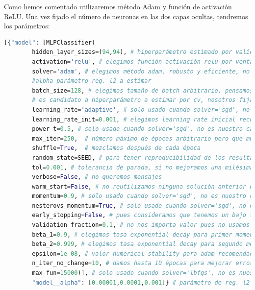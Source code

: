 \documentclass[11pt,a4paper]{article}
\theoremstyle{definition}
\begin{document}
	Como hemos comentado utilizaremos método Adam y función de activación ReLU.
	Una vez fijado el número de neuronas en las dos capas ocultas, tendremos los parámetros:
	\begin{lstlisting}[language=Python, caption= Par\'ametros usados en MLPClassifier, inputencoding=latin1]
  [{"model": [MLPClassifier(
        hidden_layer_sizes=(94,94), # hiperparámetro estimado por validación cruzada
        activation='relu', # elegimos función activación relu por ventajas ante tanh y sigmoide
        solver='adam', # elegimos método adam, robusto y eficiente, no requiere afinar tanto parámetros como sgd
        #alpha parámetro reg. l2 a estimar
        batch_size=128, # elegimos tamaño de batch arbitrario, pensamos que es un tamaño razonable para el tamaño de nuestro dataset aunque no podemos saber cómo se comportará si no es experimentalmente
        # es candidato a hiperparámetro a estimar por cv, nosotros fijamos uno por no hacer cv con mucha carga
        learning_rate='adaptive', # solo usado cuando solver='sgd', no es nuestro caso
        learning_rate_init=0.001, # elegimos learning rate inicial recomendado (pág. 2 https://arxiv.org/pdf/1412.6980.pdf) (buenos resultados por defecto)
        power_t=0.5, # solo usado cuando solver='sgd', no es nuestro caso
        max_iter=250,  # número máximo de épocas arbitrario pero que muestra convergencia
        shuffle=True,  # mezclamos después de cada época
        random_state=SEED, # para tener reproducibilidad de los resultados
        tol=0.001, # tolerancia de parada, si no mejoramos una milésima tras n_iter_no_change épocas entonces paramos, pensamos que es un valor razonable
        verbose=False, # no queremos mensajes
        warm_start=False, # no reutilizamos ninguna solución anterior durante la validación cruzada
        momentum=0.9, # solo usado cuando solver='sgd', no es nuestro caso
        nesterovs_momentum=True, # solo usado cuando solver='sgd', no es nuestro caso
        early_stopping=False, # pues consideramos que tenemos un bajo tamaño de entrenamiento
        validation_fraction=0.1, # no nos importa valor pues no usamos early_stopping
        beta_1=0.9, # elegimos tasa exponential decay para primer momento recomendada (pág. 2 https://arxiv.org/pdf/1412.6980.pdf) (buenos resultados por defecto)
        beta_2=0.999, # elegimos tasa exponential decay para segundo momento recomendada (pág. 2 https://arxiv.org/pdf/1412.6980.pdf) (buenos resultados por defecto)
        epsilon=1e-08, # valor numerical stability para adam recomendado (pág. 2 https://arxiv.org/pdf/1412.6980.pdf) (buenos resultados por defecto)
        n_iter_no_change=10, # damos hasta 10 épocas para mejorar error en 0.001, si no se mejora pararemos
        max_fun=15000)], # solo usado cuando solver='lbfgs', no es nuestro caso
        "model__alpha": [0.00001,0.0001,0.001]} # parámetro de reg. l2 para cross validation

	\end{lstlisting}
\end{document}
